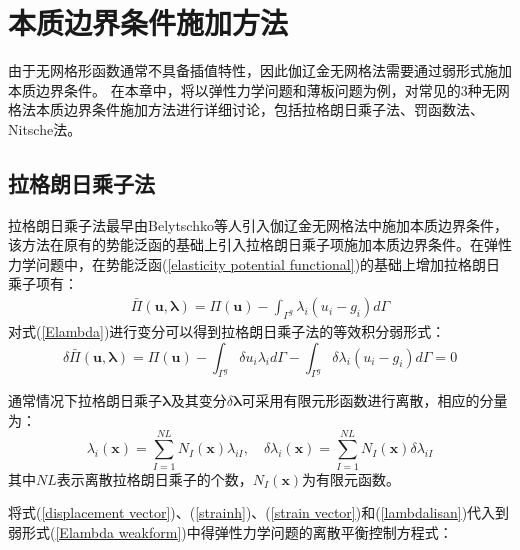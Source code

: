 \chapter{本质边界条件施加方法}
由于无网格形函数通常不具备插值特性，因此伽辽金无网格法需要通过弱形式施加本质边界条件。
在本章中，将以弹性力学问题和薄板问题为例，对常见的3种无网格法本质边界条件施加方法进行详细讨论，包括拉格朗日乘子法、罚函数法、Nitsche法。

\section{拉格朗日乘子法}
拉格朗日乘子法最早由Belytschko等人\cite{}引入伽辽金无网格法中施加本质边界条件，该方法在原有的势能泛函的基础上引入拉格朗日乘子项施加本质边界条件。在弹性力学问题中，在势能泛函(\ref{elasticity potential functional})的基础上增加拉格朗日乘子项有：
\begin{equation}\label{Elambda}
\begin{split}
    \bar{\Pi}(\pmb{u},\pmb \lambda)=\Pi(\pmb{u})-\int_{\Gamma^g}\lambda_i(u_i-g_i)d\Gamma
\end{split}
\end{equation}   
对式(\ref{Elambda})进行变分可以得到拉格朗日乘子法的等效积分弱形式：
\begin{equation}\label{Elambda weakform}
        \delta\bar{\Pi}(\pmb{u},\pmb{\lambda})=\Pi(\pmb{u})-\int_{\Gamma^g}\delta u_i\lambda_id\Gamma-\int_{\Gamma^g}\delta\lambda_i(u_i-g_i)d\Gamma=0
\end{equation}\par
通常情况下拉格朗日乘子$\pmb{\lambda}$及其变分$\delta\pmb{\lambda}$可采用有限元形函数进行离散，相应的分量为：
\begin{equation}\label{lambdalisan}
\lambda_i(\pmb{x})=\sum_{I=1}^{N\!L}N_I(\pmb{x})\lambda_{iI},\quad
\delta\lambda_i(\pmb{x})=\sum_{I=1}^{N\!L}N_I(\pmb{x})\delta\lambda_{iI}
\end{equation}
其中$N\!L$表示离散拉格朗日乘子的个数，$N_I(\pmb{x})$为有限元函数。\par
将式(\ref{displacement vector})、(\ref{strainh})、(\ref{strain vector})和(\ref{lambdalisan})代入到弱形式(\ref{Elambda weakform})中得弹性力学问题的离散平衡控制方程式：

